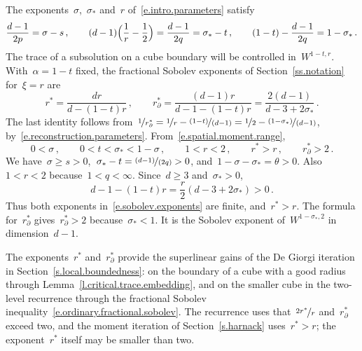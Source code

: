\documentclass[11pt,letterpaper]{article}
\numberwithin{equation}{section}
\theoremstyle{definition}
\newcommand{\nf}{\nicefrac}
\begin{document}
The exponents~$\sigma$,~$\sigma_*$ and~$r$ of~\eqref{e.intro.parameters} satisfy
\begin{equation}
	\frac{d-1}{2p}=\sigma-s\,,\qquad (d-1)\Bigl(\frac1r-\frac12\Bigr)=\frac{d-1}{2q}=\sigma_*-t\,,\qquad (1-t)-\frac{d-1}{2q}=1-\sigma_*\,.
	\label{e.reconstruction.parameters}
\end{equation}
The trace of a subsolution on a cube boundary will be controlled in~$W^{1-t,r}$. With~$\alpha=1-t$ fixed, the fractional Sobolev exponents of Section~\ref{ss.notation} for~$\xi=r$ are
\begin{equation}
	r^*=\frac{dr}{d-(1-t)r}\,,\qquad r_\partial^*=\frac{(d-1)r}{d-1-(1-t)r}=\frac{2(d-1)}{d-3+2\sigma_*}\,.
	\label{e.sobolev.exponents}
\end{equation}
The last identity follows from~$\nf1{r_\partial^*}=\nf1r-\nf{(1-t)}{(d-1)}=\nf12-\nf{(1-\sigma_*)}{(d-1)}$, by~\eqref{e.reconstruction.parameters}. From~\eqref{e.spatial.moment.range},
\begin{equation}
	0<\sigma\,,\qquad 0<t<\sigma_*<1-\sigma\,,\qquad 1<r<2\,,\qquad r^*>r\,,\qquad r_\partial^*>2\,.
	\label{e.parameter.facts}
\end{equation}
We have~$\sigma\geq s>0$,~$\sigma_*-t=\nf{(d-1)}{(2q)}>0$, and~$1-\sigma-\sigma_*=\theta>0$. Also~$1<r<2$ because~$1<q<\infty$. Since~$d\geq3$ and~$\sigma_*>0$,
\begin{equation*}
	d-1-(1-t)r=\frac r2(d-3+2\sigma_*)>0\,.
\end{equation*}
Thus both exponents in~\eqref{e.sobolev.exponents} are finite, and~$r^*>r$. The formula for~$r_\partial^*$ gives~$r_\partial^*>2$ because~$\sigma_*<1$. It is the Sobolev exponent of~$W^{1-\sigma_*,2}$ in dimension~$d-1$.

The exponents~$r^*$ and~$r_\partial^*$ provide the superlinear gains of the De Giorgi iteration in Section~\ref{s.local.boundedness}: on the boundary of a cube with a good radius through Lemma~\ref{l.critical.trace.embedding}, and on the smaller cube in the two-level recurrence through the fractional Sobolev inequality~\eqref{e.ordinary.fractional.sobolev}. The recurrence uses that~$\nf{2r^*}r$ and~$r_\partial^*$ exceed two, and the moment iteration of Section~\ref{s.harnack} uses~$r^*>r$; the exponent~$r^*$ itself may be smaller than two.

\smallskip
\end{document}
